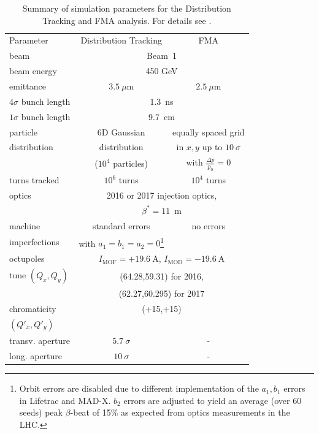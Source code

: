 \documentclass[%
 reprint,
 amsmath,amssymb,
 aps,
prstab,
]{revtex4-1}
\begin{document}
\begin{table}[b]
	\caption{\label{tab:sim_param}%
		Summary of simulation parameters for the Distribution Tracking and FMA analysis. For details see \cite{md_sim_hel_res_ex_fitterer,md_sim_hel_res_ex_fitterer_update}.
	}
	\begin{ruledtabular}
		\begin{tabular}{lcc}
			Parameter & Distribution Tracking & FMA \\
			\colrule
			beam &\multicolumn{2}{c}{Beam~1} \\
			beam energy &\multicolumn{2}{c}{450 GeV} \\
			emittance & $3.5~\mu$m& $2.5~\mu$m\\
			$4\sigma$ bunch length & \multicolumn{2}{c}{1.3~ns}\\
			$1\sigma$ bunch length & \multicolumn{2}{c}{9.7~cm}\\
			particle & 6D Gaussian & equally spaced grid\\
			distribution &  distribution & in $x,y$ up to $10~\sigma$\\
			&  ($10^4$ particles) & with $\frac{\Delta p}{p_0}=0$\\
			turns tracked & $10^6$ turns & $10^4$ turns \\\hline
			optics & \multicolumn{2}{c}{2016 or 2017 injection optics,}\\
			& \multicolumn{2}{c}{$\beta^*=11$~m}\\
			machine  & standard errors & no errors \\
			imperfections &with $a_1=b_1=a_2=0$\footnote{Orbit errors are disabled due to different implementation of the $a_1,b_1$ errors in Lifetrac and MAD-X. $b_2$ errors are adjusted to yield an average (over 60 seeds) peak $\beta$-beat of 15\% as expected from optics measurements in the LHC.} &  \\
			octupoles  & \multicolumn{2}{c}{$I_{\mathrm{MOF}}=+19.6~\mathrm{A}$, $I_{\mathrm{MOD}}=-19.6~\mathrm{A}$}\\
			tune $(Q_x,Q_y)$ & \multicolumn{2}{c}{(64.28,59.31) for 2016,}\\
			& \multicolumn{2}{c}{(62.27,60.295) for 2017}\\
			chromaticity & \multicolumn{2}{c}{(+15,+15)}\\
			 $(Q'_x,Q'_y)$ & & \\\hline
			 transv. aperture & $5.7~\sigma$ & - \\
			 long. aperture & $10~\sigma$ & - \\
		\end{tabular}
	\end{ruledtabular}
\end{table}
\end{document}
